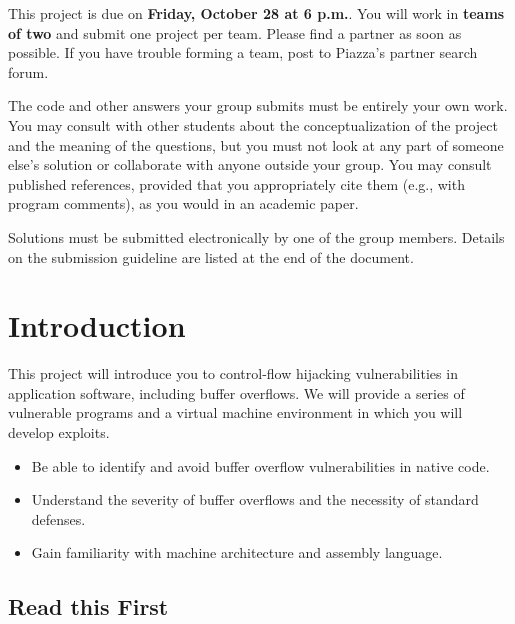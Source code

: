 \documentclass[letterpaper,12pt]{report}
\newcommand{\htitle}
{
     \noindent\parbox{\textwidth}
    {
        \course\hfill \distdate\newline
        \coursename\hfill 
        \settitle \vspace*{-.5ex}\newline
        \mbox{}\hrulefill\mbox{}
    }
    \vspace{8pt}
    \begin{center}{\Large\bf{\settitle}}\end{center}
}
\newcommand{\handout}
{
    \thispagestyle{empty}
    \markboth{}{}
    \pagestyle{plain}
    \htitle
}
\newcommand{\problemsetheader}
{
\setlength{\parindent}{0pt}

\medskip

This project is due on {\bf Friday, October 28 at 6 p.m.}. You will work in {\bf
teams of two} and submit one project per team. Please find a partner as soon as
possible. If you have trouble forming a team, post to Piazza's partner search forum.

\medskip

The code and other answers your group submits must be entirely your own work.
You may consult with other students about the conceptualization of the project
and the meaning of the questions, but you must not look at any part of someone
else's solution or collaborate with anyone outside your group. You may consult
published references, provided that you appropriately cite them (e.g., with
program comments), as you would in an academic paper.

\medskip

Solutions must be submitted electronically by one of the group members. Details
on the submission guideline are listed at the end of the document.

\medskip

\hrulefill
}
\begin{document}
\handout
\problemsetheader

\medskip


\section*{Introduction}

This project will introduce you to control-flow hijacking vulnerabilities in
application software, including buffer overflows. We will provide a series of
vulnerable programs and a virtual machine environment in which you will develop
exploits.

\begin{itemize}
\item Be able to identify and avoid buffer overflow vulnerabilities in native code.
\item Understand the severity of buffer overflows and the necessity of standard defenses.
\item Gain familiarity with machine architecture and assembly language.
\end{itemize}

\subsection*{Read this First}
\end{document}
